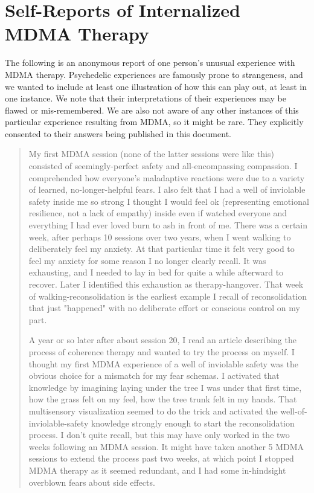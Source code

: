 \documentclass[12pt,letterpaper]{book}
\begin{document}
\chapter{Self-Reports of Internalized MDMA Therapy}
\label{autobiography}
The following is an anonymous report of one person's unusual experience with MDMA therapy. Psychedelic experiences are famously prone to strangeness, and we wanted to include at least one illustration of how this can play out, at least in one instance. We note that their interpretations of their experiences may be flawed or mis-remembered. We are also not aware of any other instances of this particular experience resulting from MDMA, so it might be rare. They explicitly consented to their answers being published in this document.
\begin{quotation}
    My first MDMA session (none of the latter sessions were like this) consisted of seemingly-perfect safety and all-encompassing compassion. I comprehended how everyone's maladaptive reactions were due to a variety of learned, no-longer-helpful fears. I also felt that I had a well of inviolable safety inside me so strong I thought I would feel ok (representing emotional resilience, not a lack of empathy) inside even if watched everyone and everything I had ever loved burn to ash in front of me. There was a certain week, after perhaps 10 sessions over two years, when I went walking to deliberately feel my anxiety. At that particular time it felt very good to feel my anxiety for some reason I no longer clearly recall. It was exhausting, and I needed to lay in bed for quite a while afterward to recover. Later I identified this exhaustion as therapy-hangover. That week of walking-reconsolidation is the earliest example I recall of reconsolidation that just "happened" with no deliberate effort or conscious control on my part.
    
    A year or so later after about session 20, I read an article describing the process of coherence therapy and wanted to try the process on myself. I thought my first MDMA experience of a well of inviolable safety was the obvious choice for a mismatch for my fear schemas. I activated that knowledge by imagining laying under the tree I was under that first time, how the grass felt on my feel, how the tree trunk felt in my hands. That multisensory visualization seemed to do the trick and activated the well-of-inviolable-safety knowledge strongly enough to start the reconsolidation process. I don't quite recall, but this may have only worked in the two weeks following an MDMA session. It might have taken another 5 MDMA sessions to extend the process past two weeks, at which point I stopped MDMA therapy as it seemed redundant, and I had some in-hindsight overblown fears about side effects.


\end{quotation}
\end{document}
